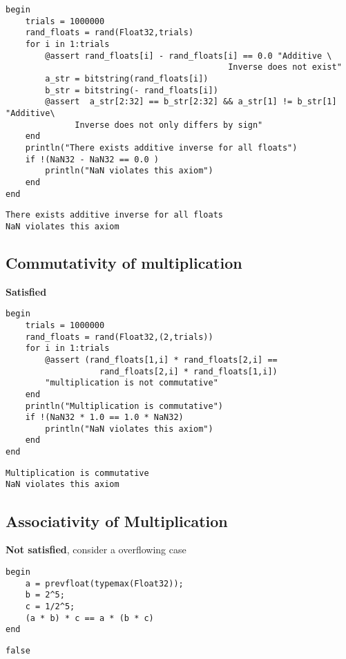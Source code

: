 \documentclass[11pt]{article}
\begin{document}
\begin{verbatim}
begin
    trials = 1000000
    rand_floats = rand(Float32,trials)
    for i in 1:trials
        @assert rand_floats[i] - rand_floats[i] == 0.0 "Additive \
                                             Inverse does not exist"
        a_str = bitstring(rand_floats[i])
        b_str = bitstring(- rand_floats[i])
        @assert  a_str[2:32] == b_str[2:32] && a_str[1] != b_str[1] "Additive\
              Inverse does not only differs by sign"
    end
    println("There exists additive inverse for all floats")
    if !(NaN32 - NaN32 == 0.0 )
        println("NaN violates this axiom")
    end
end
\end{verbatim}

\begin{verbatim}
There exists additive inverse for all floats
NaN violates this axiom
\end{verbatim}

\subsection{Commutativity of multiplication}
\label{sec:org4121f3d}
\textbf{Satisfied}

\begin{verbatim}
begin
    trials = 1000000
    rand_floats = rand(Float32,(2,trials))
    for i in 1:trials
        @assert (rand_floats[1,i] * rand_floats[2,i] ==
                   rand_floats[2,i] * rand_floats[1,i])
        "multiplication is not commutative"
    end
    println("Multiplication is commutative")
    if !(NaN32 * 1.0 == 1.0 * NaN32)
        println("NaN violates this axiom")
    end
end
\end{verbatim}

\begin{verbatim}
Multiplication is commutative
NaN violates this axiom
\end{verbatim}

\subsection{Associativity of Multiplication}
\label{sec:org7fe54d2}
\textbf{Not satisfied}, consider a overflowing case

\begin{verbatim}
begin
    a = prevfloat(typemax(Float32));
    b = 2^5;
    c = 1/2^5;
    (a * b) * c == a * (b * c)
end
\end{verbatim}

\begin{verbatim}
false
\end{verbatim}
\end{document}
